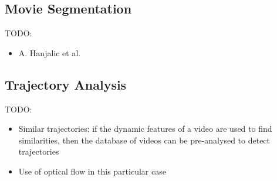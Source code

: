 \documentclass[11pt,openany,a4paper]{article}
\begin{document}

\subsection{Movie Segmentation}
\label{sec:movie-segmentation}

TODO:
\begin{itemize}
    \item A. Hanjalic et al. \cite{hanjalic1999moviesegmentation}
\end{itemize}


\subsection{Trajectory Analysis}
\label{sec:trajectory-analysis}

TODO:
\begin{itemize}
    \item Similar trajectories: if the dynamic features of a video are used to find similarities, then the database of videos can be pre-analysed to detect trajectories \cite{lai2015trajectory}
    \item Use of optical flow in this particular case
\end{itemize}



\clearpage


\end{document}

